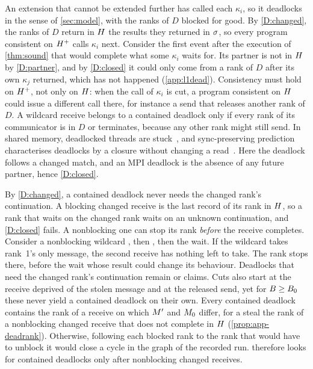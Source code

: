 \noindent An extension that cannot be extended further has called each $\kappa_i$, so it
deadlocks in the sense of \cref{sec:model}, with the ranks of $D$ blocked for good.
By \ref{D:changed}, the ranks of $D$ return in $H$ the results they returned in
$\sigma$, so every program consistent on $H^+$ calls $\kappa_i$ next. Consider the first
event after the execution of \cref{thm:sound} that would complete what some $\kappa_i$ waits
for. Its partner is not in $H$ by \ref{D:partner}, and by \ref{D:closed} it could only
come from a rank of $D$ after its own $\kappa_j$ returned, which has not happened
(\cref{app:l1dead}). Consistency must hold on $H^+$, not only on $H$: when the call
of $\kappa_i$ is cut, a program consistent on $H$ could issue a different call there, for
instance a send that releases another rank of $D$. A wildcard receive belongs to a contained
deadlock only if every rank of its communicator is in $D$ or terminates, because any other
rank might still send. In shared memory, deadlocked threads are
stuck~\citep{kalhauge18sound}, and sync-preserving prediction characterises deadlocks by a
closure without changing a read~\citep{tunc23spd}. Here the deadlock follows a changed match,
and an MPI deadlock is the absence of any future partner, hence \ref{D:closed}.

By \ref{D:changed}, a contained deadlock never needs the changed rank's continuation. A
blocking changed receive is the last record of its rank in $H$, so a rank that waits on
the changed rank waits on an unknown continuation, and \ref{D:closed} fails. A nonblocking
one can stop its rank \emph{before} the receive completes. Consider a nonblocking wildcard
, then , then the wait. If the wildcard takes
rank~1's only message, the second receive has nothing left to take. The rank stops there,
before the wait whose result could change its behaviour. Deadlocks that need the changed
rank's continuation remain \LoneSP or \Ltwo claims. Cuts also start at the receive deprived of
the stolen message and at the released send, yet for $B\ge B_0$ these never yield a contained
deadlock on their own. Every contained deadlock contains the rank of a receive on which $M'$
and $M_0$ differ, for a steal the rank of a nonblocking changed receive that does not complete
in $H$ (\cref{prop:app-deadrank}). Otherwise, following each blocked rank to the rank that
would have to unblock it would close a cycle in the graph of the recorded run. \tool therefore
looks for contained deadlocks only after nonblocking changed receives.

